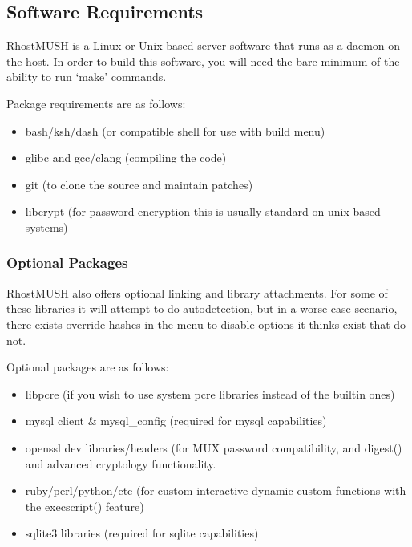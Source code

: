 \documentclass[letterpaper,10pt,english]{sphinxmanual}
\begin{document}
\subsection{Software Requirements}
\label{\detokenize{install:software-requirements}}\label{\detokenize{install:id4}}
\sphinxAtStartPar
RhostMUSH is a Linux or Unix based server software that runs as a daemon on the host.
In order to build this software, you will need the bare minimum of the ability to run ‘make’ commands.

\sphinxAtStartPar
Package requirements are as follows:
\begin{itemize}
\item {} 
\sphinxAtStartPar
bash/ksh/dash (or compatible shell \sphinxhyphen{} for use with build menu)

\item {} 
\sphinxAtStartPar
glibc and gcc/clang (compiling the code)

\item {} 
\sphinxAtStartPar
git (to clone the source and maintain patches)

\item {} 
\sphinxAtStartPar
libcrypt (for password encryption \sphinxhyphen{} this is usually standard on unix based systems)

\end{itemize}


\subsubsection{Optional Packages}
\label{\detokenize{install:optional-packages}}
\sphinxAtStartPar
RhostMUSH also offers optional linking and library attachments.
For some of these libraries it will attempt to do auto\sphinxhyphen{}detection,
but in a worse case scenario, there exists override hashes in the menu to disable options it thinks exist that do not.

\sphinxAtStartPar
Optional packages are as follows:
\begin{itemize}
\item {} 
\sphinxAtStartPar
libpcre (if you wish to use system pcre libraries instead of the built\sphinxhyphen{}in ones)

\item {} 
\sphinxAtStartPar
mysql client \& mysql\_config (required for mysql capabilities)

\item {} 
\sphinxAtStartPar
openssl dev libraries/headers (for MUX password compatibility, and digest() and advanced cryptology functionality.

\item {} 
\sphinxAtStartPar
ruby/perl/python/etc (for custom interactive dynamic custom functions with the execscript() feature)

\item {} 
\sphinxAtStartPar
sqlite3 libraries (required for sqlite capabilities)

\end{itemize}
\end{document}
